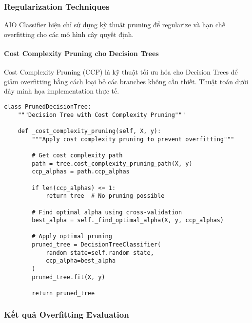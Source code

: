 \subsubsection{Regularization Techniques}

AIO Classifier hiện chỉ sử dụng kỹ thuật pruning để regularize và hạn chế overfitting cho các mô hình cây quyết định.

\paragraph{Cost Complexity Pruning cho Decision Trees}

Cost Complexity Pruning (CCP) là kỹ thuật tối ưu hóa cho Decision Trees để giảm overfitting bằng cách loại bỏ các branches không cần thiết. Thuật toán dưới đây minh họa implementation thực tế.

\begin{verbatim}
class PrunedDecisionTree:
    """Decision Tree with Cost Complexity Pruning"""
    
    def _cost_complexity_pruning(self, X, y):
        """Apply cost complexity pruning to prevent overfitting"""
        
        # Get cost complexity path
        path = tree.cost_complexity_pruning_path(X, y)
        ccp_alphas = path.ccp_alphas
        
        if len(ccp_alphas) <= 1:
            return tree  # No pruning possible
        
        # Find optimal alpha using cross-validation
        best_alpha = self._find_optimal_alpha(X, y, ccp_alphas)
        
        # Apply optimal pruning
        pruned_tree = DecisionTreeClassifier(
            random_state=self.random_state,
            ccp_alpha=best_alpha
        )
        pruned_tree.fit(X, y)
        
        return pruned_tree
\end{verbatim}

\subsubsection{Kết quả Overfitting Evaluation}

